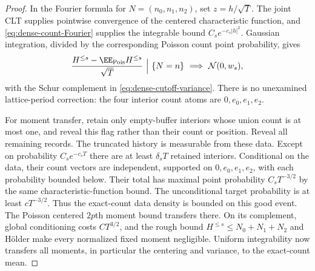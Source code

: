 \documentclass[11pt,letterpaper]{article}
\begin{document}
\begin{proof}
In the Fourier formula for $N=(n_0,n_1,n_2)$, set
$z=h/\sqrt T$. The joint CLT supplies pointwise convergence
of the centered characteristic function, and
\eqref{eq:dense-count-Fourier} supplies the integrable
bound $C_se^{-c_s|h|^2}$. Gaussian integration, divided by
the corresponding Poisson count point probability, gives
\[
 \frac{H^{\le s}-\EE_{\rm Pois}H^{\le s}}{\sqrt T}
       \ \Big|\ \{N=n\}
       \ \Longrightarrow\ \mathcal N(0,w_s),
\]
with the Schur complement in \eqref{eq:dense-cutoff-variance}.
There is no unexamined lattice-period correction: the four
interior count atoms are $0,e_0,e_1,e_2$.

For moment transfer, retain only empty-buffer interiors whose
union count is at most one, and reveal this flag rather than
their count or position. Reveal all remaining records.
The truncated history is measurable from these data.
Except on probability $C_se^{-c_sT}$ there are at least
$\delta_sT$ retained interiors. Conditional on the data,
their count vectors are independent, supported on
$0,e_0,e_1,e_2$, with each probability bounded below.
Their total has maximal point probability $C_sT^{-3/2}$
by the same characteristic-function bound. The unconditional
target probability is at least $cT^{-3/2}$.
Thus the exact-count data density is bounded on this good
event. The Poisson centered $2p$th moment bound transfers
there. On its complement, global conditioning costs
$CT^{3/2}$, and the rough bound
$H^{\le s}\le N_0+N_1+N_2$ and H\"older make every normalized
fixed moment negligible. Uniform integrability now transfers
all moments, in particular the centering and variance, to
the exact-count mean.
\end{proof}
\end{document}
